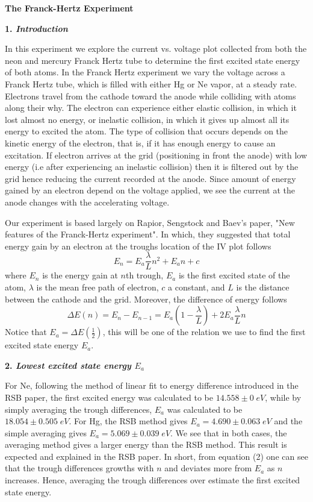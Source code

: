 \documentclass[12pt]{article}
\begin{document}
\textbf{The Franck-Hertz Experiment}
\bigskip

\textbf{1. \textit{Introduction}}
\smallskip

In this experiment we explore the current vs. voltage plot collected from both the neon and mercury Franck Hertz tube to determine the first excited state energy of both atoms. In the Franck Hertz experiment we vary the voltage across a Franck Hertz tube, which is filled with either Hg or Ne vapor, at a steady rate. Electrons travel from the cathode toward the anode while colliding with atoms along their why. The electron can experience either elastic collision, in which it lost almost no energy, or inelastic collision, in which it gives up almost all its energy to excited the atom. The type of collision that occurs depends on the kinetic energy of the electron, that is, if it has enough energy to cause an excitation. If electron arrives at the grid (positioning in front the anode) with low energy (i.e after experiencing an inelastic collision) then it is filtered out by the grid hence reducing the current recorded at the anode. Since amount of energy gained by an electron depend on the voltage applied, we see the current at the anode changes with the accelerating voltage.

Our experiment is based largely on Rapior, Sengstock and Baev's paper, "New features of the Franck-Hertz experiment". In which, they suggested that total energy gain by an electron at the troughs location of the IV plot follows
\begin{equation}\label{eqn:einstein}
E_n = E_a \frac{\lambda}{L}n^2 + E_a n+c
\end{equation}
where $E_n$ is the energy gain at $n$th trough, $E_a$ is the first excited state of the atom, $\lambda$ is the mean free path of electron, $c$ a constant, and $L$ is the distance between the cathode and the grid. Moreover, the difference of energy follows 
\begin{equation}\label{eqn:einstein}
\Delta E(n) = E_n - E_{n-1} =E_a(1-\frac{\lambda}{L}) + 2E_a\frac{\lambda}{L}n
\end{equation}
Notice that $E_a = \Delta E(\frac{1}{2})$, this will be one of the relation we use to find the first excited state energy $E_a$.
\bigskip

\textbf{2. \textit{Lowest excited state energy $E_a$}}
\smallskip

For Ne, following the method of linear fit to energy difference introduced in the RSB paper, the first excited energy was calculated to be $14.558 \pm 0 \;eV$, while by simply averaging the trough differences, $E_a$ was calculated to be $18.054 \pm 0.505 \;eV$. For Hg, the RSB method gives $E_a = 4.690 \pm 0.063 \; eV$ and the simple averaging gives $E_a = 5.069\pm 0.039 \; eV$. We see that in both cases, the averaging method gives a larger energy than the RSB method. This result is expected and explained in the RSB paper. In short, from equation (2) one can see that the trough differences growths with $n$ and deviates more from $E_a$ as $n$ increases. Hence, averaging the trough differences over estimate the first excited state energy.
\end{document}
